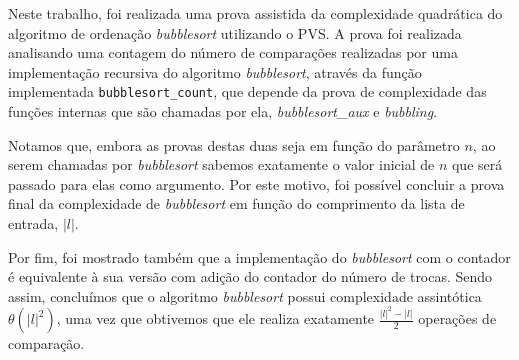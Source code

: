Neste trabalho, foi realizada uma prova assistida da complexidade quadrática do algoritmo de ordenação \textit{bubblesort} utilizando o PVS. A prova foi realizada analisando uma contagem do número
de comparações realizadas por uma implementação recursiva do algoritmo \textit{bubblesort},
através da função implementada \texttt{bubblesort\_count}, que depende da prova de complexidade
das funções internas que são chamadas por ela, \textit{bubblesort\_aux} e \textit{bubbling}.

Notamos que, embora
as provas destas duas seja em função do parâmetro $n$, ao serem chamadas por \textit{bubblesort}
sabemos exatamente o valor inicial de $n$ que será passado para elas como argumento. Por
este motivo, foi possível concluir a prova final da complexidade de \textit{bubblesort} em
função do comprimento da lista de entrada, $|l|$.

Por fim, foi mostrado também que a implementação do \textit{bubblesort} com o contador é equivalente
à sua versão com adição do contador do número de trocas. Sendo assim, concluímos que o algoritmo
\textit{bubblesort} possui complexidade assintótica $\theta(|l|^2)$, uma vez que obtivemos
que ele realiza exatamente $\frac{|l|^2 - |l|}{2}$ operações de comparação.


